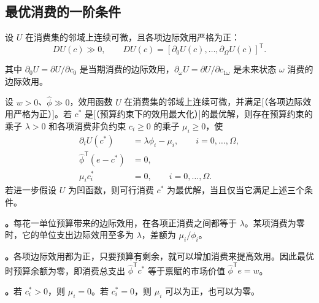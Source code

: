 \subsection{最优消费的一阶条件}
\begin{tcolorbox}[knowledge,title=边际效用向量]
设 $U$ 在消费集的邻域上连续可微，且各项边际效用严格为正：
\begin{equation}
 DU(c)\gg0,\qquad
 DU(c)=[\partial_0U(c),\ldots,\partial_\Omega U(c)]^{\mathsf T}.\label{eq:wj-three-marginal-utility}
\end{equation}

其中 $\partial_0U=\partial U/\partial c_0$ 是当期消费的边际效用，$\partial_\omega U=\partial U/\partial c_{1\omega}$ 是未来状态 $\omega$ 消费的边际效用。
\end{tcolorbox}

\begin{tcolorbox}[knowledge,title=消费最优的库恩--塔克条件（Kuhn--Tucker 条件）]
设 $w>0$、$\hat\phi\gg0$，效用函数 $U$ 在消费集的邻域上连续可微，并满足[（各项边际效用严格为正）]。若 $c^*$ 是[（预算约束下的效用最大化）]的最优解，则存在预算约束的乘子 $\lambda>0$ 和各项消费非负约束 $c_i\ge0$ 的乘子 $\mu_i\ge0$，使
\begin{subequations}
\begin{align}
 \partial_iU(c^*)&=\lambda\phi_i-\mu_i,\qquad i=0,\ldots,\Omega,\label{eq:wj-three-kkt-stationarity}\\
 \hat\phi^{\mathsf T}(e-c^*)&=0,\label{eq:wj-three-kkt-budget}\\
 \mu_i c_i^*&=0,\qquad i=0,\ldots,\Omega.\label{eq:wj-three-kkt-complementarity}
\end{align}
\end{subequations}
若进一步假设 $U$ 为凹函数，则可行消费 $c^*$ 为最优解，当且仅当它满足上述三个条件。

\textbf{。}每花一单位预算带来的边际效用，在各项正消费之间都等于 $\lambda$。某项消费为零时，它的单位支出边际效用至多为 $\lambda$，差额为 $\mu_i/\phi_i$。

\textbf{。}各项边际效用都为正，只要预算有剩余，就可以增加消费来提高效用。因此最优时预算余额为零，即消费总支出 $\hat\phi^{\mathsf T}c^*$ 等于禀赋的市场价值 $\hat\phi^{\mathsf T}e=w$。

\textbf{。}若 $c_i^*>0$，则 $\mu_i=0$。若 $c_i^*=0$，则 $\mu_i$ 可以为正，也可以为零。
\end{tcolorbox}

